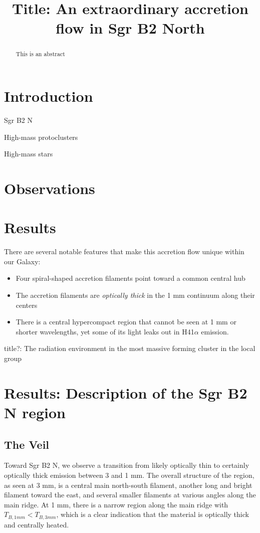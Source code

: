 \documentclass[twocolumn]{aastex61}
\begin{document}
\title{Title: An extraordinary accretion flow in Sgr B2 North}

\begin{abstract}
    This is an abstract
\end{abstract}



\section{Introduction}

Sgr B2 N

High-mass protoclusters

High-mass stars


\section{Observations}


\section{Results}

There are several notable features that make this accretion flow unique within our Galaxy:

\begin{itemize}
    \item Four spiral-shaped accretion filaments point toward a common central hub
    \item The accretion filaments are \emph{optically thick} in the 1 mm continuum
        along their centers
    \item There is a central hypercompact \hii region that cannot be seen at 1 mm
        or shorter wavelengths, yet some of its light leaks out in H41$\alpha$ emission.
\end{itemize}


title?: The radiation environment in the most massive forming cluster in the local group

\section{Results: Description of the Sgr B2 N region}
\subsection{The Veil}
\label{sec:theveil}
Toward Sgr B2 N, we observe a transition from likely optically thin to
certainly optically thick emission between 3 and 1 mm.  The overall structure
of the region, as seen at 3 mm, is a central main north-south filament, another
long and bright filament toward the east, and several smaller filaments at
various angles along the main ridge.  At 1 mm, there is a narrow region along
the main ridge with $T_{B,1 mm} < T_{B,3 mm}$, which is a clear indication
that the material is optically thick and centrally heated.
\end{document}

